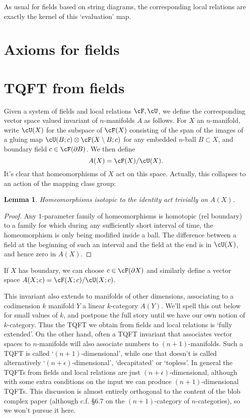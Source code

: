 \documentclass[11pt]{amsart}
\theoremstyle{plain}
\newtheorem{lem}[prop]{Lemma}
\newcommand{\bdy}{\partial}
\newcommand{\tensor}{\otimes}
\begin{document}
As usual for fields based on string diagrams, the corresponding local relations are exactly the kernel of this `evaluation' map.

\section{Axioms for fields}

\section{TQFT from fields}
Given a system of fields and local relations $\cF, \cU$, we define the corresponding vector space valued invariant of $n$-manifolds $A$ as follows. For $X$ an $n$-manifold, write $\cU(X)$ for the subspace of $\cF(X)$ consisting of the span of the images of a gluing map $\cU(B; c) \tensor \cF(X \setminus B; c)$ for any embedded $n$-ball $B \subset X$, and boundary field $c \in \cF(\bdy B)$. We then define
$$A(X) = \cF(X) / \cU(X).$$
It's clear that homeomorphisms of $X$ act on this space. Actually, this collapses to an action of the mapping class group:
\begin{lem}
Homeomorphisms isotopic to the identity act trivially on $A(X)$.
\end{lem}
\begin{proof}
Any $1$-parameter family of homeomorphisms is homotopic (rel boundary) to a family for which during any sufficiently short interval of time, the homeomorphism is only being modified inside a ball. The difference between a field at the beginning of such an interval and the field at the end is in $\cU(X)$, and hence zero in $A(X)$.
\end{proof}


If $X$ has boundary, we can choose $c \in \cF(\bdy X)$ and similarly define a vector space $A(X; c) = \cF(X; c) / \cU(X; c)$.

This invariant also extends to manifolds of other dimensions, associating to a codimension $k$ manifold $Y$ a linear $k$-category $A(Y)$. We'll spell this out below for small values of $k$, and postpone the full story until we have our own notion of $k$-category. Thus the TQFT we obtain from fields and local relations is `fully extended'. On the other hand, often a TQFT invariant that associates vector spaces to $n$-manifolds will also associate numbers to $(n+1)$-manifolds.  Such a TQFT is called `$(n+1)$-dimensional', while one that doesn't is called alternatively `$(n+\epsilon)$-dimensional', `decapitated' or `topless'. In general the TQFTs from fields and local relations are just $(n+\epsilon)$-dimensional, although with some extra conditions on the input we can produce $(n+1)$-dimensional TQFTs. This discussion is almost entirely orthogonal to the content of the blob complex paper (although c.f. \S 6.7 on the $(n+1)$-category of $n$-categories), so we won't pursue it here.
\end{document}
